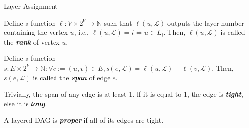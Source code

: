 \documentclass{beamer}
\begin{document}
\begin{frame}{Layer Assignment}
    
    \begin{definition}
        
        Define a function $\ell : V \times 2^V \rightarrow \mathbb{N}$ such that $\ell(u,\mathcal{L})$ outputs the layer number containing the vertex $u$, i.e., $\ell(u,\mathcal{L}) = i \iff u \in L_i$. Then, $\ell(u,\mathcal{L})$ is called the \textbf{\textit{rank}} of vertex $u$.

    \end{definition}

    \begin{definition}
        
        Define a function $s : E \times 2^V \rightarrow \mathbb{N} : \forall e := (u,v) \in E, s(e,\mathcal{L}) = \ell(u,\mathcal{L}) - \ell(v,\mathcal{L})$. Then, $s(e,\mathcal{L})$ is called the \textbf{\textit{span}} of edge $e$.

        Trivially, the span of any edge is at least 1. If it is equal to 1, the edge is \textbf{\textit{tight}}, else it is \textbf{\textit{long}}.

    \end{definition}

    \begin{definition}
        
        A layered DAG is \textbf{\textit{proper}} if all of its edges are tight.

    \end{definition}

\end{frame}
\end{document}
